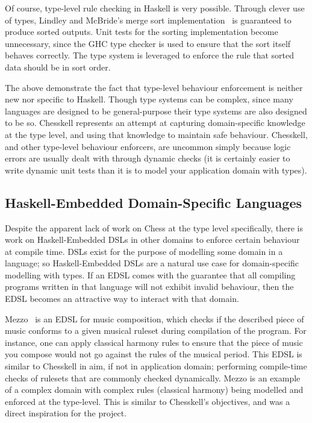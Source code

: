Of course, type-level rule checking in Haskell is very possible. Through clever use of types, Lindley and McBride's merge sort implementation~\cite{hasochism} is guaranteed to produce sorted outputs. Unit tests for the sorting implementation become unnecessary, since the GHC type checker is used to ensure that the sort itself behaves correctly. The type system is leveraged to enforce the rule that sorted data should be in sort order.

The above demonstrate the fact that type-level behaviour enforcement is neither new nor specific to Haskell. Though type systems can be complex, since many languages are designed to be general-purpose their type systems are also designed to be so. Chesskell represents an attempt at capturing domain-specific knowledge at the type level, and using that knowledge to maintain safe behaviour. Chesskell, and other type-level behaviour enforcers, are uncommon simply because logic errors are usually dealt with through dynamic checks (it is certainly easier to write dynamic unit tests than it is to model your application domain with types).

\subsection{Haskell-Embedded Domain-Specific Languages}

Despite the apparent lack of work on Chess at the type level specifically, there is work on Haskell-Embedded DSLs in other domains to enforce certain behaviour at compile time. DSLs exist for the purpose of modelling some domain in a language; so Haskell-Embedded DSLs are a natural use case for domain-specific modelling with types. If an EDSL comes with the guarantee that all compiling programs written in that language will not exhibit invalid behaviour, then the EDSL becomes an attractive way to interact with that domain.

Mezzo~\cite{mezzohaskellsymposium} is an EDSL for music composition, which checks if the described piece of music conforms to a given musical ruleset during compilation of the program. For instance, one can apply classical harmony rules to ensure that the piece of music you compose would not go against the rules of the musical period. This EDSL is similar to Chesskell in aim, if not in application domain; performing compile-time checks of rulesets that are commonly checked dynamically. Mezzo is an example of a complex domain with complex rules (classical harmony) being modelled and enforced at the type-level. This is similar to Chesskell's objectives, and was a direct inspiration for the project.

